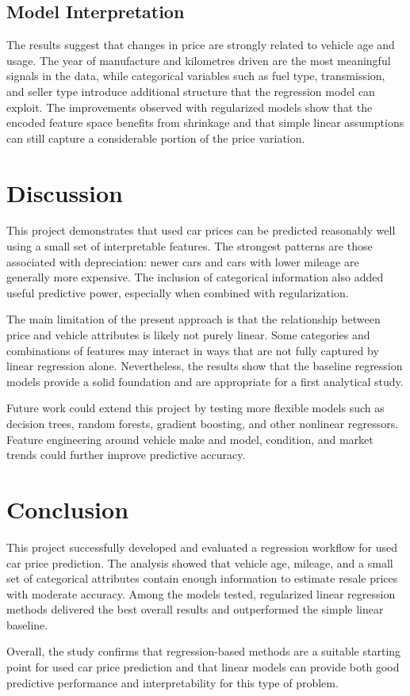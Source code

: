\section{Model Interpretation}
The results suggest that changes in price are strongly related to vehicle age and usage. The year of manufacture and kilometres driven are the most meaningful signals in the data, while categorical variables such as fuel type, transmission, and seller type introduce additional structure that the regression model can exploit. The improvements observed with regularized models show that the encoded feature space benefits from shrinkage and that simple linear assumptions can still capture a considerable portion of the price variation.

\chapter{Discussion}
This project demonstrates that used car prices can be predicted reasonably well using a small set of interpretable features. The strongest patterns are those associated with depreciation: newer cars and cars with lower mileage are generally more expensive. The inclusion of categorical information also added useful predictive power, especially when combined with regularization.

The main limitation of the present approach is that the relationship between price and vehicle attributes is likely not purely linear. Some categories and combinations of features may interact in ways that are not fully captured by linear regression alone. Nevertheless, the results show that the baseline regression models provide a solid foundation and are appropriate for a first analytical study.

Future work could extend this project by testing more flexible models such as decision trees, random forests, gradient boosting, and other nonlinear regressors. Feature engineering around vehicle make and model, condition, and market trends could further improve predictive accuracy.

\chapter{Conclusion}
This project successfully developed and evaluated a regression workflow for used car price prediction. The analysis showed that vehicle age, mileage, and a small set of categorical attributes contain enough information to estimate resale prices with moderate accuracy. Among the models tested, regularized linear regression methods delivered the best overall results and outperformed the simple linear baseline.

Overall, the study confirms that regression-based methods are a suitable starting point for used car price prediction and that linear models can provide both good predictive performance and interpretability for this type of problem.
